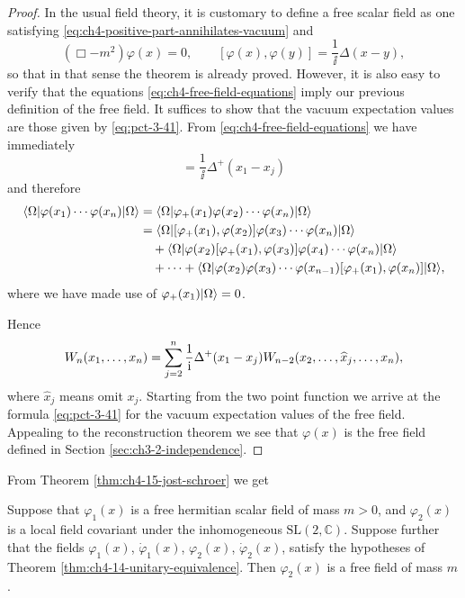 \begin{proof}
In the usual field theory, it is customary to define a free scalar field as
one satisfying \eqref{eq:ch4-positive-part-annihilates-vacuum} and
\begin{equation}
  (\Box-m^2)\varphi(x)=0,\qquad
  [\varphi(x),\varphi(y)]=\frac{1}{\ii}\Delta(x-y),
  \tag{4-84}\label{eq:ch4-free-field-equations}
\end{equation}
so that in that sense the theorem is already proved.  However, it is also
easy to verify that the equations \eqref{eq:ch4-free-field-equations} imply our previous definition of the
free field.  It suffices to show that the vacuum expectation values are those
given by \eqref{eq:pct-3-41}.  From \eqref{eq:ch4-free-field-equations} we have immediately
\begin{equation*}
  [\varphi_+(x_1),\varphi(x_j)]
  =\frac{1}{\ii}\Delta^+(x_1-x_j)
\end{equation*}
and therefore
\begin{align*}
  \langle \Omega\rvert\varphi(x_1)\cdots\varphi(x_n)\lvert \Omega\rangle
  &=
  \langle \Omega\rvert\varphi_+(x_1)\varphi(x_2)\cdots
  \varphi(x_n)\lvert \Omega\rangle \\
  &=
  \langle \Omega\rvert[\varphi_+(x_1),\varphi(x_2)]
  \varphi(x_3)\cdots\varphi(x_n)\lvert \Omega\rangle \\
  &\quad+
  \langle \Omega\rvert\varphi(x_2)[\varphi_+(x_1),\varphi(x_3)]
  \varphi(x_4)\cdots\varphi(x_n)\lvert \Omega\rangle \\
  &\quad+\cdots+
  \langle \Omega\rvert\varphi(x_2)\varphi(x_3)\cdots\varphi(x_{n-1})
  [\varphi_+(x_1),\varphi(x_n)]\lvert \Omega\rangle,
\end{align*}
where we have made use of $\varphi_+(x_1)\lvert \Omega\rangle=0$.

Hence
\begin{equation*}
  W_n(x_1,\ldots,x_n)
  =\sum_{j=2}^{n}\frac{1}{\mathrm{i}}\Delta^+(x_1-x_j)
  W_{n-2}(x_2,\ldots,\widehat{x}_j,\ldots,x_n),
\end{equation*}
where $\widehat{x}_j$ means omit $x_j$.  Starting from the two point
function we arrive at the formula \eqref{eq:pct-3-41} for the vacuum expectation values of
the free field.  Appealing to the reconstruction theorem we see that
$\varphi(x)$ is the free field defined in Section \ref{sec:ch3-2-independence}.
\end{proof}

From Theorem \ref{thm:ch4-15-jost-schroer} we get

\begin{theorem}\label{thm:ch4-16-haag}
Suppose that $\varphi_1(x)$ is a free hermitian scalar field of mass $m>0$,
and $\varphi_2(x)$ is a local field covariant under the inhomogeneous
$\mathrm{SL}(2,\mathbb C)$.  Suppose further that the fields
$\varphi_1(x)$, $\dot{\varphi}_1(x)$, $\varphi_2(x)$,
$\dot{\varphi}_2(x)$, satisfy the hypotheses of Theorem \ref{thm:ch4-14-unitary-equivalence}.  Then
$\varphi_2(x)$ is a free field of mass $m$.
\end{theorem}

